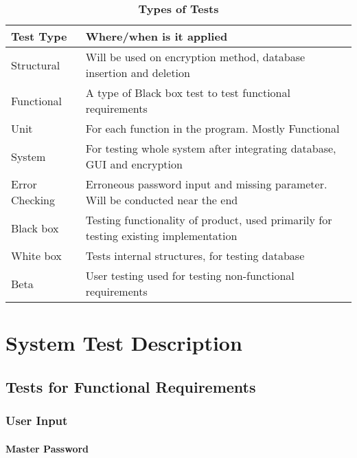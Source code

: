 \documentclass[12pt, titlepage]{article}
\begin{document}
\begin{table}[!htbp]
    \caption{\textbf{Types of Tests} \label{3Table}}
    \begin{tabularx}{\textwidth}{p{3cm}X}
        \toprule
        \textbf{Test Type} & \textbf{Where/when is it applied}\\
        \midrule
        Structural & Will be used on encryption method, database insertion and deletion\\\hline
        Functional & A type of Black box test to test functional requirements\\\hline 
        Unit & For each function in the program. Mostly Functional\\\hline
        System & For testing whole system after integrating database, GUI and encryption\\\hline
        Error Checking & Erroneous password input and missing parameter. Will be conducted near the end\\\hline
        Black box & Testing functionality of product, used primarily for testing existing implementation\\\hline
        White box & Tests internal structures, for testing database\\\hline
        Beta & User testing used for testing non-functional requirements\\
        \bottomrule
    \end{tabularx}
\end{table}

\section{System Test Description}
	
\subsection{Tests for Functional Requirements}

\subsubsection{User Input}
		
\paragraph{Master Password}
\end{document}
